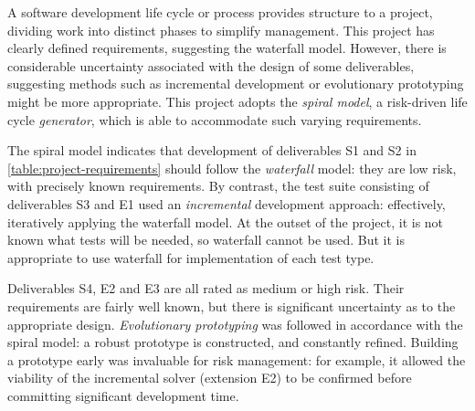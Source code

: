 



A software development life cycle or process provides structure to a project, dividing work into distinct phases to simplify management. This project has clearly defined requirements, suggesting the waterfall model. However, there is considerable uncertainty associated with the design of some deliverables, suggesting methods such as incremental development or evolutionary prototyping might be more appropriate. This project adopts the \emph{spiral model}, a risk-driven life cycle \emph{generator}, which is able to accommodate such varying requirements.

The spiral model indicates that development of deliverables S1 and S2 in \cref{table:project-requirements} should follow the \emph{waterfall} model: they are low risk, with precisely known requirements. By contrast, the test suite consisting of deliverables S3 and E1 used an \emph{incremental} development approach: effectively, iteratively applying the waterfall model. At the outset of the project, it is not known what tests will be needed\footnotemark, so waterfall cannot be used. But it is appropriate to use waterfall for implementation of each test type.

Deliverables S4, E2 and E3 are all rated as medium or high risk. Their requirements are fairly well known, but there is significant uncertainty as to the appropriate design. \emph{Evolutionary prototyping} was followed in accordance with the spiral model: a robust prototype is constructed, and constantly refined\footnotemark. Building a prototype early was invaluable for risk management: for example, it allowed the viability of the incremental solver (extension E2) to be confirmed before committing significant development time.

